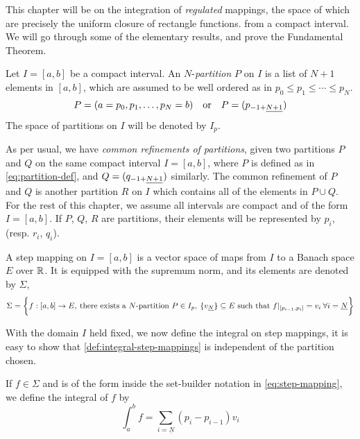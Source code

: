 \documentclass[../main-manifolds.tex]{subfiles}
\begin{document}
\newpage
{}
This chapter will be on the integration of \emph{regulated} mappings, the space of which are precisely the uniform closure of rectangle functions. from a compact interval. We will go through some of the elementary results, and prove the Fundamental Theorem.\\

\begin{definition}[Partition on {$[a,b]$}]
    Let $I=[a,b]$ be a compact interval. An  $N$-\emph{partition} $P$ on $I$ is a list of $N+1$ elements in $[a,b]$, which are assumed to be well ordered as in $p_0\leq p_1\leq\cdots\leq p_N$. 
    \begin{equation}\label{eq:partition-def}
        P = (a = p_0,p_1,\ldots,p_N = b)\qqtext{or} P = (\UL{p}[-1+][N+1])
    \end{equation}
    The space of partitions on $I$ will be denoted by $I_p$.
\end{definition}

As per usual, we have \emph{common refinements of partitions}, given two partitions $P$ and $Q$ on the same compact interval $I=[a,b]$, where $P$ is defined as in \cref{eq:partition-def}, and $Q = (\UL{q}[-1+][N+1])$ similarly. The common refinement of $P$ and $Q$ is another partition $R$ on $I$ which contains all of the elements in $P\cup Q$. For the rest of this chapter, we assume all intervals are compact and of the form $I = [a,b]$. If $P$, $Q$, $R$ are partitions, their elements will be represented by $p_i$, (resp. $r_i$, $q_i$).

\begin{definition}\label{def:step-mapping}
A step mapping on $I = [a,b]$ is a vector space of maps from $I$ to a Banach space $E$ over $\mathbb{R}$. It is equipped with the supremum norm, and its elements are denoted by $\Sigma$,
\begin{equation}\label{eq:step-mapping}
    \Sigma = \bigset{f: [a,b]\to E,\: \text{there exists a $N$-partition }P\in I_p,\:\{\UL{v}[N]\}\subseteq E\text{ such that } f\vert_{[p_{i-1}, p_i]} = v_i\: \forall i = \underline{N}}
\end{equation}
\end{definition}
With the domain $I$ held fixed, we now define the integral on step mappings, it is easy to show that \cref{def:integral-step-mappings} is independent of the partition chosen.
\begin{definition}\label{def:integral-step-mappings}
    If $f\in \Sigma$ and is of the form inside the set-builder notation in \cref{eq:step-mapping}, we define the integral of $f$ by
    \begin{equation}\label{eq:integral-step-mappings}
        \int_a^b f = \sum_{i=\underline{N}}(p_i - p_{i-1})v_i
    \end{equation}
    
\end{definition}
\end{document}
